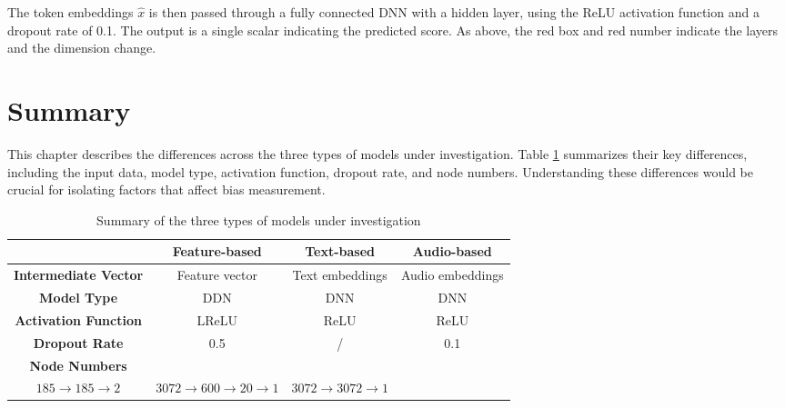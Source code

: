 The token embeddings $\hat{x}$ is then passed through a fully connected DNN with a hidden layer, using the ReLU activation function and a dropout rate of 0.1. The output is a single scalar indicating the predicted score. As above, the red box and red number indicate the layers and the dimension change.

\section{Summary}
This chapter describes the differences across the three types of models under investigation. Table \ref{tab:models} summarizes their key differences, including the input data, model type, activation function, dropout rate, and node numbers. Understanding these differences would be crucial for isolating factors that affect bias measurement.

\begin{table}[H]
    \centering
    \begin{tabular}{|c|c|c|c|}
        \hline
                                     & \textbf{Feature-based}                              & \textbf{Text-based}                   & \textbf{Audio-based} \\ \hline
        \textbf{Intermediate Vector} & Feature vector                                      & Text embeddings                       & Audio embeddings     \\ \hline
        \textbf{Model Type}          & DDN                                                 & DNN                                   & DNN                  \\ \hline
        \textbf{Activation Function} & LReLU                                               & ReLU                                  & ReLU                 \\ \hline
        \textbf{Dropout Rate}        & 0.5                                                 & /                                     & 0.1                  \\ \hline
        \textbf{Node Numbers}        & \makecell[l]{                                                                                                      %
        $356 \rightarrow 185 \rightarrow$                                                                                                                 \\%
            $185 \rightarrow 185 \rightarrow 2$%
        }
                                     & $3072 \rightarrow 600 \rightarrow 20 \rightarrow 1$ & $3072 \rightarrow 3072 \rightarrow 1$                        \\ \hline
    \end{tabular}
    \caption{Summary of the three types of models under investigation}
    \label{tab:models}
\end{table}
